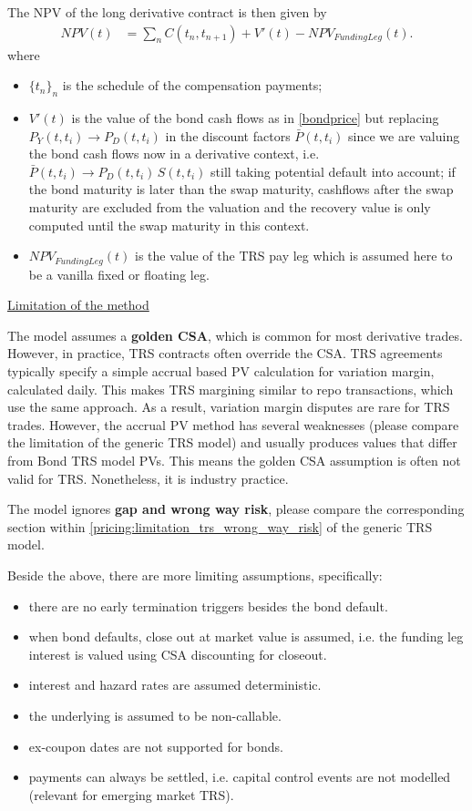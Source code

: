 \medskip
The NPV of the long derivative contract is then given by
%
\begin{align*}
NPV(t)&=\sum_{n}C(t_n,t_{n+1})+V'(t)-NPV_{FundingLeg}(t).
\end{align*}
where
\begin{itemize}
\item $\{t_n\}_n$ is the schedule of the compensation
payments;
\item $V'(t)$ is the value of the bond cash flows as in
\eqref{bondprice} but replacing $P_Y(t,t_i)\rightarrow
P_D(t,t_i)$ in the discount factors $\bar{P}(t,t_i)$
 since we are valuing the bond cash flows
now in a derivative context, i.e. $\bar{P}(t,t_i) \rightarrow
P_D(t,t_i)\,S(t,t_i)$ still taking potential default into account; if the bond maturity is later than the swap maturity,
cashflows after the swap maturity are excluded from the valuation and the recovery value is only computed until the swap
maturity in this context.
\item $NPV_{FundingLeg}(t)$ is the value of the TRS pay leg which is
 assumed here to be  a vanilla fixed or floating leg.
\end{itemize}

\underline{Limitation of the method}

The model assumes a \textbf{golden CSA}, which is common for most derivative trades.
However, in practice, TRS contracts often override the CSA.
TRS agreements typically specify a simple accrual based PV calculation for variation margin, calculated daily.
This makes TRS margining similar to repo transactions, which use the same approach.
As a result, variation margin disputes are rare for TRS trades.
However, the accrual PV method has several weaknesses (please compare the limitation of the generic TRS model) and usually produces values that differ from Bond TRS model PVs.
This means the golden CSA assumption is often not valid for TRS. Nonetheless, it is industry practice.

\smallskip

The model ignores \textbf{gap and wrong way risk}, please compare the corresponding section within \ref{pricing:limitation_trs_wrong_way_risk} of the generic TRS model.

\smallskip

Beside the above, there are more limiting assumptions, specifically:
\begin{itemize}
\item there are no early termination triggers besides the bond default.
\item when bond defaults, close out at market value is assumed, i.e. the funding leg interest is valued using CSA discounting for closeout.
\item interest and hazard rates are assumed deterministic.
\item the underlying is assumed to be non-callable.
\item ex-coupon dates are not supported for bonds.
\item payments can always be settled, i.e. capital control events are not modelled (relevant for emerging market TRS).
\end{itemize}